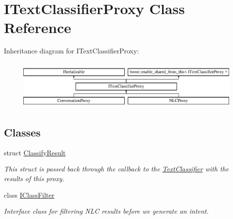 \hypertarget{class_i_text_classifier_proxy}{}\section{I\+Text\+Classifier\+Proxy Class Reference}
\label{class_i_text_classifier_proxy}
Inheritance diagram for I\+Text\+Classifier\+Proxy\+:\begin{figure}[H]
\begin{center}
\leavevmode
\includegraphics[height=2.514970cm]{class_i_text_classifier_proxy}
\end{center}
\end{figure}
\subsection*{Classes}
\begin{DoxyCompactItemize}
\item 
struct \hyperlink{struct_i_text_classifier_proxy_1_1_classify_result}{Classify\+Result}
\begin{DoxyCompactList}\small\item\em This struct is passed back through the callback to the \hyperlink{class_text_classifier}{Text\+Classifier} with the results of this proxy. \end{DoxyCompactList}\item 
class \hyperlink{class_i_text_classifier_proxy_1_1_i_class_filter}{I\+Class\+Filter}
\begin{DoxyCompactList}\small\item\em Interface class for filtering N\+LC results before we generate an intent. \end{DoxyCompactList}\end{DoxyCompactItemize}
